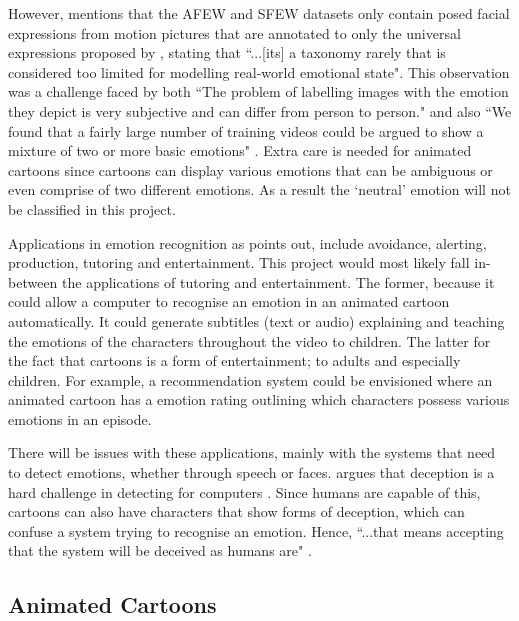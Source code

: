 \documentclass[report, 11pt, oneside]{dissertation}
\begin{document}
However, \citep{Zafeiriou:2016kn} mentions that the AFEW and SFEW datasets only contain posed facial expressions from motion pictures that are annotated to only the universal expressions proposed by \citep{ekman1971constants}, stating that ``...[its] a taxonomy rarely that is considered too limited for modelling real-world emotional state". This observation was a challenge faced by both \citep{Gajarla:us} ``The problem of labelling images with the emotion they depict is very subjective and can differ from person to person." \citep[4]{Gajarla:us} and also \citep{Kahou:2015cr} ``We found that a fairly large number of training videos could be argued to show a mixture of two or more basic emotions" \citep[47]{Kahou:2015cr}. Extra care is needed for  animated cartoons since cartoons can display various emotions that can be ambiguous or even comprise of two different emotions. As a result the `neutral' emotion will not be classified in this project.
	
Applications in emotion recognition as \citeauthor{ERIHCI:911197} points out, include avoidance, alerting, production, tutoring and entertainment. This project would most likely fall in-between the applications of tutoring and entertainment. The former, because it could allow a computer to recognise an emotion in an animated cartoon automatically. It could generate subtitles (text or audio) explaining and teaching the emotions of the characters throughout the video to children. The latter for the fact that cartoons is a form of entertainment; to adults and especially children. For example, a recommendation system could be envisioned where an animated cartoon has a emotion rating outlining which characters possess various emotions in an episode.

There will be issues with these applications, mainly with the systems that need to detect emotions, whether through speech or faces. \citeauthor{ERIHCI:911197} argues that deception is a hard challenge in detecting for computers \citeyearpar{ERIHCI:911197}. Since humans are capable of this, cartoons can also have characters that show forms of deception, which can confuse a system trying to recognise an emotion. Hence, ``...that means accepting that the system will be deceived as humans are" \citep{ERIHCI:911197}.	

\subsection{Animated Cartoons}
\end{document}
